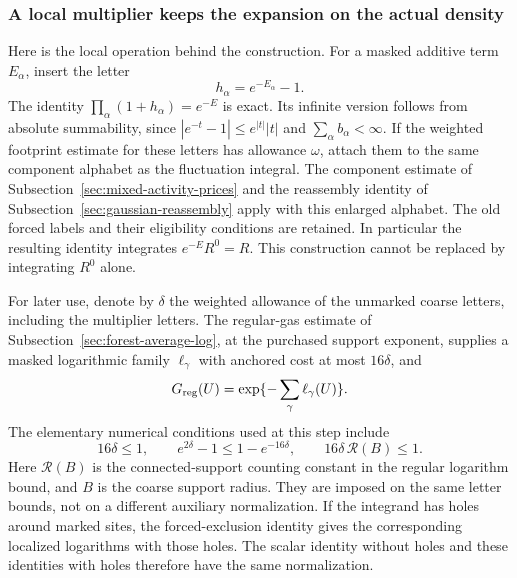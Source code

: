\subsubsection{A local multiplier keeps the expansion on the actual density}

Here is the local operation behind the construction. For a masked
additive term $E_\alpha$, insert the letter
\[
 h_\alpha=e^{-E_\alpha}-1.
\]
The identity $\prod_\alpha(1+h_\alpha)=e^{-E}$ is exact. Its infinite
version follows from absolute summability, since
$|e^{-t}-1|\le e^{|t|}|t|$ and $\sum_\alpha b_\alpha<\infty$.
If the weighted footprint estimate for these letters has allowance
$\omega$, attach them to the same component alphabet as the fluctuation
integral. The component estimate of
Subsection~\ref{sec:mixed-activity-prices} and the reassembly identity of
Subsection~\ref{sec:gaussian-reassembly} apply with this enlarged alphabet.
The old forced labels and their eligibility conditions are retained.
In particular the resulting identity integrates $e^{-E}R^0=R$.
This construction cannot be replaced by integrating $R^0$ alone.

For later use, denote by $\delta$ the weighted allowance of the
unmarked coarse letters, including the multiplier letters. The
regular-gas estimate of Subsection~\ref{sec:forest-average-log}, at the
purchased support exponent, supplies a masked logarithmic family
$\ell_\gamma$ with anchored cost at most $16\delta$, and
\begin{equation}\label{eq:restart-log}
 G_{\rm reg}(U)=\exp\{-\sum_\gamma\ell_\gamma(U)\}.
\end{equation}
The elementary numerical conditions used at this step include
\[
 16\delta\le1,\qquad
 e^{2\delta}-1\le1-e^{-16\delta},\qquad
 16\delta\,\mathcal R(B)\le1.
\]
Here $\mathcal R(B)$ is the connected-support counting constant in the
regular logarithm bound, and $B$ is the coarse support radius. They
are imposed on the same letter bounds, not on a different auxiliary
normalization. If the integrand has holes around marked sites, the
forced-exclusion identity gives the corresponding localized logarithms
with those holes. The scalar identity without holes and these identities
with holes therefore have the same normalization.

